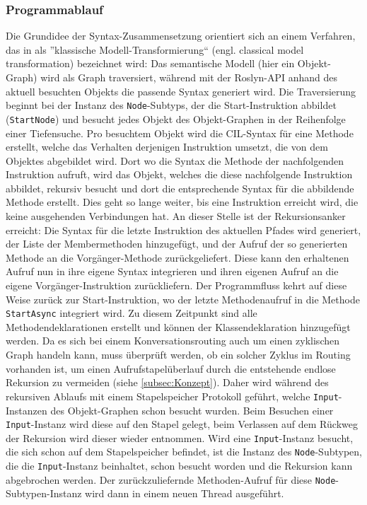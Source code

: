 \subsubsection{Programmablauf}
\label{subsubsec:Programablauf}
Die Grundidee der Syntax-Zusammensetzung orientiert sich an einem Verfahren, das in \cite[S. 272f]{Voelter:13} als ''klassische Modell-Transformierung`` (engl. classical model transformation) bezeichnet wird: Das semantische Modell (hier ein Objekt-Graph) wird als Graph traversiert, während mit der Roslyn-API anhand des aktuell besuchten Objekts die passende Syntax generiert wird. Die Traversierung beginnt bei der Instanz des \texttt{Node}-Subtyps, der die Start-Instruktion abbildet (\texttt{StartNode}) und besucht jedes Objekt des Objekt-Graphen in der Reihenfolge einer Tiefensuche. Pro besuchtem Objekt wird die CIL-Syntax für eine Methode erstellt, welche das Verhalten derjenigen Instruktion umsetzt, die von dem Objektes abgebildet wird. Dort wo die Syntax die Methode der nachfolgenden Instruktion aufruft, wird das Objekt, welches die diese nachfolgende Instruktion abbildet, rekursiv besucht und dort die entsprechende Syntax für die abbildende Methode erstellt. Dies geht so lange weiter, bis eine Instruktion erreicht wird, die keine ausgehenden Verbindungen hat. An dieser Stelle ist der Rekursionsanker erreicht: Die Syntax für die letzte Instruktion des aktuellen Pfades wird generiert, der Liste der Membermethoden hinzugefügt, und der Aufruf der so generierten Methode an die Vorgänger-Methode zurückgeliefert. Diese kann den erhaltenen Aufruf nun in ihre eigene Syntax integrieren und ihren eigenen Aufruf an die eigene Vorgänger-Instruktion zurückliefern. Der Programmfluss kehrt auf diese Weise zurück zur Start-Instruktion, wo der letzte Methodenaufruf in die Methode \texttt{StartAsync} integriert wird. Zu diesem Zeitpunkt sind alle Methodendeklarationen erstellt und können der Klassendeklaration hinzugefügt werden. 
\newline
Da es sich bei einem Konversationsrouting auch um einen zyklischen Graph handeln kann, muss überprüft werden, ob ein solcher Zyklus im Routing vorhanden ist, um einen Aufrufstapelüberlauf durch die entstehende endlose Rekursion zu vermeiden (siehe \ref{subsec:Konzept}). Daher wird während des rekursiven Ablaufs mit einem Stapelspeicher Protokoll geführt, welche \texttt{Input}-Instanzen des Objekt-Graphen schon besucht wurden. Beim Besuchen einer \texttt{Input}-Instanz wird diese auf den Stapel gelegt, beim Verlassen auf dem Rückweg der Rekursion wird dieser wieder entnommen. Wird eine \texttt{Input}-Instanz besucht, die sich schon auf dem Stapelspeicher befindet, ist die Instanz des \texttt{Node}-Subtypen, die die \texttt{Input}-Instanz beinhaltet, schon besucht worden und die Rekursion kann abgebrochen werden. Der zurückzuliefernde Methoden-Aufruf für diese \texttt{Node}-Subtypen-Instanz wird dann in einem neuen Thread ausgeführt. 
